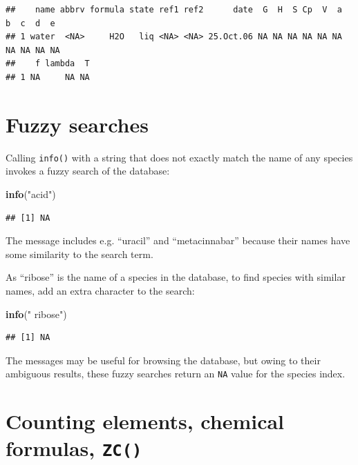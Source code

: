 \documentclass[]{tufte-book}
\newenvironment{Shaded}{}{}
\newcommand{\KeywordTok}[1]{\textcolor[rgb]{0.00,0.44,0.13}{\textbf{#1}}}
\newcommand{\StringTok}[1]{\textcolor[rgb]{0.25,0.44,0.63}{#1}}
\newcommand{\NormalTok}[1]{#1}
\begin{document}
\begin{verbatim}
##    name abbrv formula state ref1 ref2      date  G  H  S Cp  V  a  b  c  d  e
## 1 water  <NA>     H2O   liq <NA> <NA> 25.Oct.06 NA NA NA NA NA NA NA NA NA NA
##    f lambda  T
## 1 NA     NA NA
\end{verbatim}

\section{Fuzzy searches}\label{fuzzy-searches}

Calling {\texttt{info()}} with a string that does not exactly match the
name of any species invokes a fuzzy search of the database:

\begin{Shaded}
\begin{Highlighting}[]
\KeywordTok{info}\NormalTok{(}\StringTok{"acid"}\NormalTok{)}
\end{Highlighting}
\end{Shaded}

\begin{verbatim}
## [1] NA
\end{verbatim}

The message includes e.g. ``uracil'' and ``metacinnabar'' because their
names have some similarity to the search term.

As ``ribose'' is the name of a species in the database, to find species
with similar names, add an extra character to the search:

\begin{Shaded}
\begin{Highlighting}[]
\KeywordTok{info}\NormalTok{(}\StringTok{" ribose"}\NormalTok{)}
\end{Highlighting}
\end{Shaded}

\begin{verbatim}
## [1] NA
\end{verbatim}

The messages may be useful for browsing the database, but owing to their
ambiguous results, these fuzzy searches return an \texttt{NA} value for
the species index.

\section{\texorpdfstring{Counting elements, chemical formulas,
{\texttt{ZC()}}}{Counting elements, chemical formulas, ZC()}}\label{counting-elements-chemical-formulas-zc}
\end{document}
